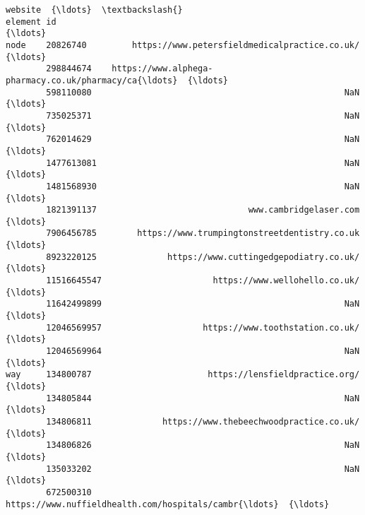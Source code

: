 \documentclass[11pt]{article}
\begin{document}
\begin{tcolorbox}[breakable, size=fbox, boxrule=.5pt, pad at break*=1mm, opacityfill=0]
\begin{Verbatim}[commandchars=\\\{\}]
                                                               website  {\ldots}  \textbackslash{}
element id                                                              {\ldots}
node    20826740         https://www.petersfieldmedicalpractice.co.uk/  {\ldots}
        298844674    https://www.alphega-pharmacy.co.uk/pharmacy/ca{\ldots}  {\ldots}
        598110080                                                  NaN  {\ldots}
        735025371                                                  NaN  {\ldots}
        762014629                                                  NaN  {\ldots}
        1477613081                                                 NaN  {\ldots}
        1481568930                                                 NaN  {\ldots}
        1821391137                              www.cambridgelaser.com  {\ldots}
        7906456785        https://www.trumpingtonstreetdentistry.co.uk  {\ldots}
        8923220125              https://www.cuttingedgepodiatry.co.uk/  {\ldots}
        11516645547                      https://www.wellohello.co.uk/  {\ldots}
        11642499899                                                NaN  {\ldots}
        12046569957                    https://www.toothstation.co.uk/  {\ldots}
        12046569964                                                NaN  {\ldots}
way     134800787                       https://lensfieldpractice.org/  {\ldots}
        134805844                                                  NaN  {\ldots}
        134806811              https://www.thebeechwoodpractice.co.uk/  {\ldots}
        134806826                                                  NaN  {\ldots}
        135033202                                                  NaN  {\ldots}
        672500310    https://www.nuffieldhealth.com/hospitals/cambr{\ldots}  {\ldots}


\end{Verbatim}
\end{tcolorbox}
\end{document}
